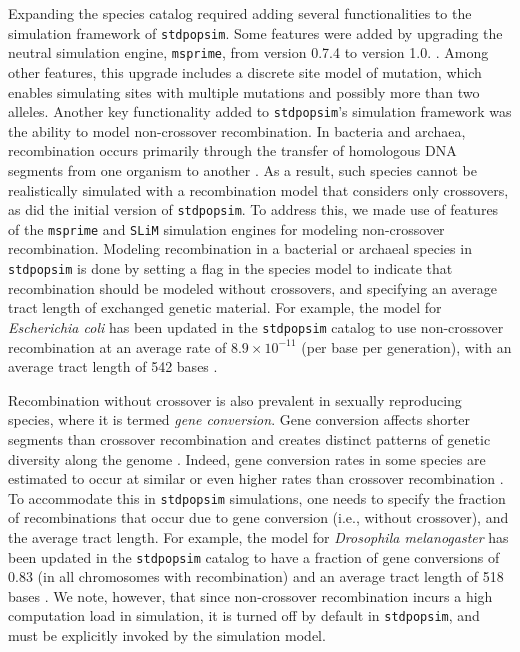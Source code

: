 \documentclass[hidelinks]{article}
\newcommand{\stdpopsim}{\texttt{stdpopsim}\xspace}
\begin{document}
Expanding the species catalog required adding several functionalities to the simulation framework of \stdpopsim.
Some features were added by upgrading the neutral simulation engine, \texttt{msprime}, from version 0.7.4 to version 1.0. \citep{Baumdicker2022}.
Among other features, this upgrade includes a discrete site model of mutation,
which enables simulating sites with multiple mutations and possibly more than two alleles.
Another key functionality added to \stdpopsim's simulation framework was the ability to model non-crossover recombination.
In bacteria and archaea, recombination occurs primarily through the transfer of homologous DNA segments from one organism to another \citep{Thomas2005,Didelot2010,Gophna2022}.
As a result, such species cannot be realistically simulated with a recombination model that considers only crossovers,
as did the initial version of \stdpopsim.
To address this, we made use of features of the \texttt{msprime} and \texttt{SLiM} simulation engines for modeling non-crossover recombination.
Modeling recombination in a bacterial or archaeal species in \stdpopsim is done by setting a flag in the species model to indicate that recombination should be modeled without crossovers,
and specifying an average tract length of exchanged genetic material.
For example, the model for \textit{Escherichia coli} has been updated in the \stdpopsim catalog to use non-crossover recombination at an average rate of $8.9\times 10^{-11}$ (per base per generation),
with an average tract length of 542 bases \citep{Wielgoss2011,Didelot2012}.

Recombination without crossover is also prevalent in sexually reproducing species,
where it is termed \emph{gene conversion}.
Gene conversion affects shorter segments than crossover recombination and creates distinct patterns of genetic diversity along the genome \citep{Korunes2017}.
Indeed, gene conversion rates in some species are estimated to occur at similar or even higher rates than crossover recombination \citep{Gay2007,Comeron2012,Wijnker2013}.
To accommodate this in \stdpopsim simulations,
one needs to specify the fraction of recombinations that occur due to gene conversion (i.e., without crossover), and the average tract length.
For example, the model for \emph{Drosophila melanogaster} has been updated in the \stdpopsim catalog to have a fraction of gene conversions of 0.83 (in all chromosomes with recombination) and an average tract length of 518 bases \citep{Comeron2012}.
We note, however, that since non-crossover recombination incurs a high computation load in simulation,
it is turned off by default in \stdpopsim, and must be explicitly invoked by the simulation model.
\end{document}
